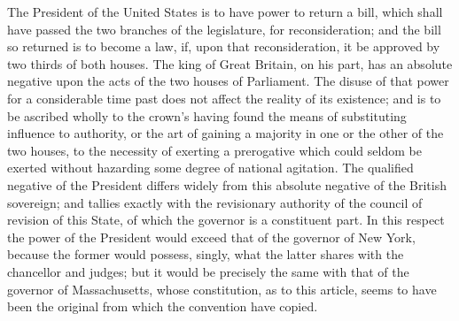 The President of the United States is to have power to return a bill, which shall have passed the two branches of the legislature, for reconsideration; and the bill so returned is to become a law, if, upon that reconsideration, it be approved by two thirds of both houses. The king of Great Britain, on his part, has an absolute negative upon the acts of the two houses of Parliament. The disuse of that power for a considerable time past does not affect the reality of its existence; and is to be ascribed wholly to the crown's having found the means of substituting influence to authority, or the art of gaining a majority in one or the other of the two houses, to the necessity of exerting a prerogative which could seldom be exerted without hazarding some degree of national agitation. The qualified negative of the President differs widely from this absolute negative of the British sovereign; and tallies exactly with the revisionary authority of the council of revision of this State, of which the governor is a constituent part. In this respect the power of the President would exceed that of the governor of New York, because the former would possess, singly, what the latter shares with the chancellor and judges; but it would be precisely the same with that of the governor of Massachusetts, whose constitution, as to this article, seems to have been the original from which the convention have copied.

